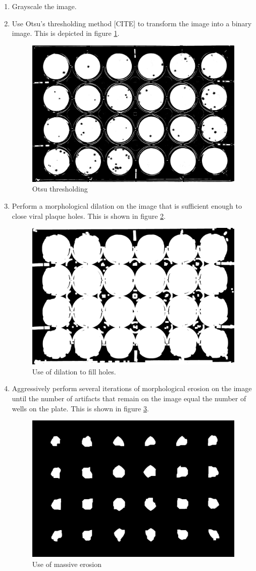\documentclass[11pt,final,twocolumn]{IEEEtran}
\begin{document}
\begin{enumerate}
\item Grayscale the image.
\item Use Otsu's thresholding method [CITE] to transform the image into a binary image. This is depicted in figure \ref{fig:segOtsu}.
\begin{figure}[H]
\centering
\includegraphics[width=.4\textwidth]{segmentOtsu.jpg}
\caption{Otsu thresholding}
\label{fig:segOtsu}
\end{figure}


\item
Perform a morphological dilation on the image that is sufficient enough to close viral plaque holes. This is shown in figure \ref{fig:segFillHoles}.
\begin{figure}[H]
\centering
\includegraphics[width=.4\textwidth]{segmentFillHoles.jpg}
\caption{Use of dilation to fill holes.}
\label{fig:segFillHoles}
\end{figure}



\item
Aggressively perform several iterations of morphological erosion on the image until the number of artifacts that remain on the image equal the number of wells on the plate. This is shown in figure \ref{fig:segErode}.
\begin{figure}[H]
\centering
\includegraphics[width=.4\textwidth]{segmentErode.jpg}
\caption{Use of massive erosion}
\label{fig:segErode}
\end{figure}



\end{enumerate}
\end{document}
